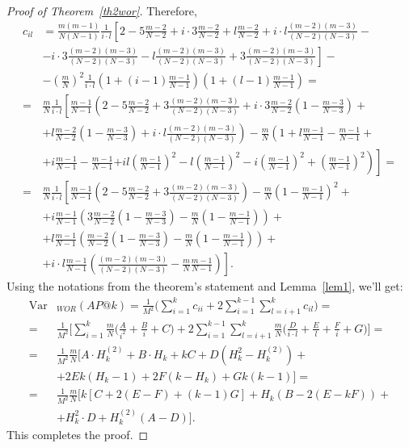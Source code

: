 \documentclass{tpms-l}
\theoremstyle{definition}
\theoremstyle{remark}
\numberwithin{equation}{section}
\begin{document}
\begin{proof}[Proof of Theorem~\ref {th2wor}]
Therefore, 
\begin{equation*}
\begin{split}
c_{i l} & = \frac{m(m-1)}{N(N-1)}\frac{1}{i\cdot l}\left[2-5\frac{m-2}{N-2}+i\cdot 3\frac{m-2}{N-2}+l\frac{m-2}{N-2}+i\cdot l\frac{(m-2)(m-3)}{(N-2)(N-3)}- \right.\\
&\left.-i\cdot 3\frac{(m-2)(m-3)}{(N-2)(N-3)}-l\frac{(m-2)(m-3)}{(N-2)(N-3)}+3\frac{(m-2)(m-3)}{(N-2)(N-3)}\right]-\\
&-\left(\frac{m}{N}\right)^2\frac{1}{i\cdot l}\left(1+(i-1)\frac{m-1}{N-1}\right)\left(1+(l-1)\frac{m-1}{N-1}\right)=\\
= & \frac{m}{N}\frac{1}{i\cdot l}\left[\frac{m-1}{N-1}\left(2-5\frac{m-2}{N-2}+3\frac{(m-2)(m-3)}{(N-2)(N-3)}+i\cdot 3\frac{m-2}{N-2}\left(1-\frac{m-3}{N-3}\right)+ \right.\right.\\
&\left. +l\frac{m-2}{N-2}\left(1-\frac{m-3}{N-3}\right)+i\cdot l\frac{(m-2)(m-3)}{(N-2)(N-3)}\right)-\frac{m}{N}\left(1+l\frac{m-1}{N-1}-\frac{m-1}{N-1}+ \right.\\
&+i\frac{m-1}{N-1}-\frac{m-1}{N-1} \left.\left.+il\left(\frac{m-1}{N-1}\right)^2-l\left(\frac{m-1}{N-1}\right)^2-i\left(\frac{m-1}{N-1}\right)^2+\left(\frac{m-1}{N-1}\right)^2\right)\right]=\\
= &\frac{m}{N}\frac{1}{i\cdot l}\left[\frac{m-1}{N-1}\left(2-5\frac{m-2}{N-2}+3\frac{(m-2)(m-3)}{(N-2)(N-3)}\right)-\frac{m}{N}\left(1-\frac{m-1}{N-1}\right)^2+ \right.\\
&+i\frac{m-1}{N-1}\left(3\frac{m-2}{N-2}\left(1-\frac{m-3}{N-3}\right)-\frac{m}{N}\left(1-\frac{m-1}{N-1}\right)\right)+\\
&+ l\frac{m-1}{N-1}\left(\frac{m-2}{N-2}\left(1-\frac{m-3}{N-3}\right)-\frac{m}{N}\left(1-\frac{m-1}{N-1}\right)\right)+\\
&+ \left. i\cdot l\frac{m-1}{N-1}\left(\frac{(m-2)(m-3)}{(N-2)(N-3)}-\frac{m}{N}\frac{m-1}{N-1}\right)\right].
\end{split}
\end{equation*}
Using the notations from the theorem's statement and  Lemma~\ref{lem1},  we'll get:
\begin{equation*}
\begin{split}
\operatorname{Var}&_{WOR}(AP@k)= \frac{1}{M^2} \Bigg( \sum_{i=1}^{k}c_{ii} + 2\sum_{i=1}^{k-1}\sum_{l=i+1}^{k}c_{il} \Bigg) =
\\
= &  \frac{1}{M^2} \Bigg[\sum_{i=1}^{k}\frac{m}{N}\Bigg(\frac{A}{i^2}+\frac{B}{i}+C \Bigg)+2\sum_{i=1}^{k-1}\sum_{l=i+1}^{k}\frac{m}{N}\Bigg(\frac{D}{i\cdot l}+\frac{E}{l}+\frac{F}{i}+G \Bigg) \Bigg] =
\\
= & \frac{1}{M^2} \frac{m}{N}\Bigg[ A \cdot H_k^{\left(2\right)} + B \cdot H_k + kC + D(H_k^2 - H_k^{\left(2\right)})  +\\
& +   2Ek(H_k-1) + 2F(k-H_k) + Gk(k-1) \Bigg] =
\\
= & \frac{1}{M^2} \frac{m}{N}\Bigg[ k[C+2(E-F) + (k-1)G] + H_k(B-2(E-kF))+\\
&+ H_k^2 \cdot D + H_k^{\left(2\right)}(A-D) \Bigg]. 
\end{split}
\end{equation*}
This completes the proof.
\end{proof}
\end{document}
